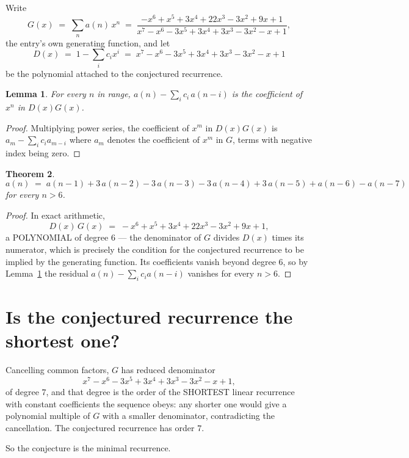 \documentclass[11pt,a4paper]{article}
\theoremstyle{plain}
\newtheorem{theorem}{Theorem}
\newtheorem{lemma}[theorem]{Lemma}
\theoremstyle{definition}
\begin{document}
Write
\[
G(x)\;=\;\sum_{n}a(n)\,x^{n}\;=\;\frac{- x^{6} + x^{5} + 3 x^{4} + 22 x^{3} - 3 x^{2} + 9 x + 1}{x^{7} - x^{6} - 3 x^{5} + 3 x^{4} + 3 x^{3} - 3 x^{2} - x + 1},
\]
the entry's own generating function, and let
\[
D(x)\;=\;1-\sum_i c_i x^{i}\;=\;x^{7} - x^{6} - 3 x^{5} + 3 x^{4} + 3 x^{3} - 3 x^{2} - x + 1
\]
be the polynomial attached to the conjectured recurrence.

\begin{lemma}\label{lem:key}
For every $n$ in range, $a(n)-\sum_i c_i\,a(n-i)$ is the coefficient of $x^{n}$ in
$D(x)G(x)$.
\end{lemma}

\begin{proof}
Multiplying power series, the coefficient of $x^{m}$ in $D(x)G(x)$ is
$a_m-\sum_i c_i a_{m-i}$ where $a_m$ denotes the coefficient of $x^{m}$ in $G$, terms with
negative index being zero.
\end{proof}

\begin{theorem}
\[
a(n)\;=\;a(n-1) + 3\,a(n-2) - 3\,a(n-3) - 3\,a(n-4) + 3\,a(n-5) + a(n-6) - a(n-7)
\]
for every $n>6$.
\end{theorem}

\begin{proof}
In exact arithmetic,
\[
D(x)\,G(x)\;=\;- x^{6} + x^{5} + 3 x^{4} + 22 x^{3} - 3 x^{2} + 9 x + 1,
\]
a POLYNOMIAL of degree $6$ --- the denominator of $G$ divides $D(x)$ times its numerator,
which is precisely the condition for the conjectured recurrence to be implied by the
generating function. Its coefficients vanish beyond degree $6$, so by
Lemma~\ref{lem:key} the residual $a(n)-\sum_ic_ia(n-i)$ vanishes for every
$n>6$.
\end{proof}

\section{Is the conjectured recurrence the shortest one?}

Cancelling common factors, $G$ has reduced denominator
\[
x^{7} - x^{6} - 3 x^{5} + 3 x^{4} + 3 x^{3} - 3 x^{2} - x + 1,
\]
of degree $7$, and that degree is the order of the SHORTEST linear recurrence with
constant coefficients the sequence obeys: any shorter one would give a polynomial multiple of
$G$ with a smaller denominator, contradicting the cancellation. The conjectured recurrence has
order $7$.

So the conjecture is the minimal recurrence.
\end{document}
